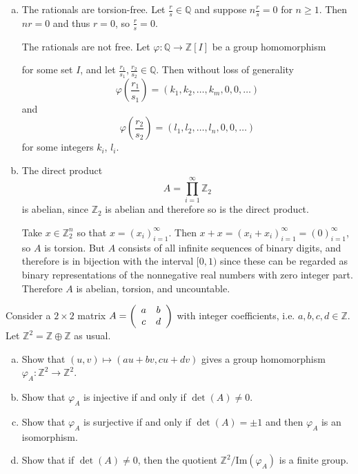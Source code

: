 \documentclass{article}
\newcounter{Problem}
\newenvironment{Problem}{\begin{Exercise}[name={Problem},
                                          counter={Problem}]}
                        {\end{Exercise}}
\begin{document}
\begin{Answer}
\begin{enumerate}[(a)]
{  }
  \item{
    The rationals are torsion-free. Let $\frac{r}{s} \in
    \mathbb{Q}$ and suppose $n \frac{r}{s} = 0$ for $n \geq 1$.
    Then $n r = 0$ and thus $r = 0$, so $\frac{r}{s} = 0$.

    The rationals are not free. Let
    $\varphi : \mathbb{Q} \to \mathbb{Z}[I]$ be a group homomorphism

    for some set $I$, and let $\frac{r_1}{s_1}, \frac{r_2}{s_2} \in
    \mathbb{Q}$. Then without loss of generality
    $$
    \varphi\left(\frac{r_1}{s_1}\right) =
      (k_1, k_2, \dots, k_m, 0, 0, \dots)
    $$
    and
    $$
    \varphi\left(\frac{r_2}{s_2}\right) =
      (l_1, l_2, \dots, l_n, 0, 0, \dots)
    $$
    for some integers $k_i$, $l_i$.
  }
  \item{
    The direct product
    $$
    A = \prod_{i=1}^\infty \mathbb{Z}_2
    $$
    is abelian, since $\mathbb{Z}_2$ is abelian and therefore so is
    the direct product.

    Take $x \in \mathbb{Z}_2^n$ so that $x = (x_i)_{i=1}^\infty$. Then
    $x + x = (x_i + x_i)_{i=1}^\infty = (0)_{i=1}^\infty$, so $A$ is torsion.
    But $A$ consists of all infinite sequences of binary digits, and
    therefore is in bijection with the interval $[0, 1)$ since these
    can be regarded as binary representations of the nonnegative real
    numbers with zero integer part.
    Therefore $A$ is abelian, torsion, and uncountable.
  }
\end{enumerate}
\end{Answer}

\pagebreak

\begin{Problem}
Consider a $2 \times 2$ matrix
$A = \left(\begin{array}{c c}
       a & b \\ c & d
     \end{array}\right)$
with integer coefficients, i.e.
$a, b, c, d \in \mathbb{Z}$. Let
$\mathbb{Z}^2 = \mathbb{Z} \oplus \mathbb{Z}$ as usual.
\begin{enumerate}[(a)]
  \item{
    Show that $(u, v) \mapsto (au + bv, cu + dv)$ gives a group
    homomorphism $\varphi_A : \mathbb{Z}^2 \to \mathbb{Z}^2$.
  }
  \item{
    Show that $\varphi_A$ is injective if and only if
    $\det(A) \neq 0$.
  }
  \item{
    Show that $\varphi_A$ is surjective if and only if
    $\det(A) = \pm 1$ and then $\varphi_A$ is an isomorphism.
  }
  \item{
    Show that if $\det(A) \neq 0$, then the quotient
    $\mathbb{Z}^2 / \mathrm{Im}(\varphi_A)$ is a finite group.
  }
\end{enumerate}
\end{Problem}
\end{document}
